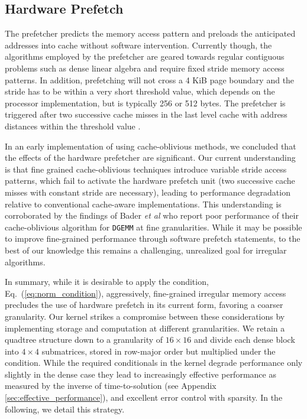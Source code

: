 \subsection{Hardware Prefetch}

The prefetcher predicts the memory access pattern and pre\-loads the
anticipated addresses into cache without software intervention. Currently
though, the algorithms employed by the prefetcher are geared towards regular
contiguous problems such as dense linear algebra and require fixed stride
memory access patterns. In addition, prefetching will not cross a 4 KiB page
boundary and the stride has to be within a very short threshold value, which
depends on the processor implementation, but is typically 256 or 512 bytes.
The prefetcher is triggered after two successive cache misses in the last
level cache with address distances within the threshold value
\cite[Sec.~2.4.4.4]{Intel2009}.

In an early implementation of \SpAMM{} using cache-oblivious methods, we
concluded that the effects of the hardware prefetcher are significant.  Our
current understanding is that fine grained cache-oblivious techniques introduce
variable stride access patterns, which fail to activate the hardware prefetch
unit (two successive cache misses with constant stride are necessary), leading
to performance degradation relative to conventional cache-aware
implementations. This understanding is corroborated by the findings of Bader
\emph{et al} \cite{bader08hardware-oriented} who report poor performance of
their cache-oblivious algorithm for {\tt DGEMM} at fine granularities. While it
may be possible to improve fine-grained performance through software prefetch
statements, to the best of our knowledge this remains a challenging, unrealized
goal for irregular algorithms.

In summary, while it is desirable to apply the \SpAMM{} condition,
Eq.~(\ref{eq:norm_condition}), aggressively, fine-grained irregular memory
access precludes the use of hardware prefetch in its current form, favoring a
coarser granularity. Our kernel strikes a compromise between these
considerations by implementing storage and computation at different
granularities. We retain a quadtree structure down to a granularity of $16
\times 16$ and divide each dense block into $4 \times 4$ submatrices, stored in
row-major order but multiplied under the \SpAMM{} condition. While the required
conditionals in the kernel degrade performance only slightly in the dense case
they lead to increasingly effective performance as measured by the inverse of
time-to-solution (see Appendix \ref{sec:effective_performance}), and excellent
error control with sparsity. In the following, we detail this strategy.

